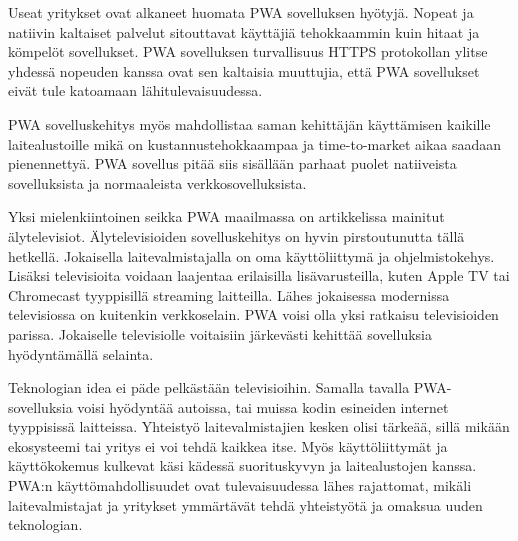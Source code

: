 \documentclass{tktltiki}
\begin{document}
Useat yritykset ovat alkaneet huomata PWA sovelluksen hyötyjä. Nopeat ja natiivin kaltaiset palvelut sitouttavat käyttäjiä tehokkaammin kuin hitaat ja kömpelöt sovellukset. PWA sovelluksen turvallisuus HTTPS protokollan ylitse yhdessä nopeuden kanssa ovat sen kaltaisia muuttujia, että PWA sovellukset eivät tule katoamaan lähitulevaisuudessa. \cite{8441701} 

PWA sovelluskehitys myös mahdollistaa saman kehittäjän käyttämisen kaikille laitealustoille mikä on kustannustehokkaampaa ja time-to-market aikaa saadaan pienennettyä. PWA sovellus pitää siis sisällään parhaat puolet natiiveista sovelluksista ja normaaleista verkkosovelluksista. 

Yksi mielenkiintoinen seikka PWA maailmassa on artikkelissa \cite{8287006} mainitut älytelevisiot. Älytelevisioiden sovelluskehitys on hyvin pirstoutunutta tällä hetkellä. Jokaisella laitevalmistajalla on oma käyttöliittymä ja ohjelmistokehys. Lisäksi televisioita voidaan laajentaa erilaisilla lisävarusteilla, kuten Apple TV tai Chromecast tyyppisillä streaming laitteilla. Lähes jokaisessa modernissa televisiossa on kuitenkin verkkoselain. PWA voisi olla yksi ratkaisu televisioiden parissa. Jokaiselle televisiolle voitaisiin järkevästi kehittää sovelluksia hyödyntämällä selainta. 

Teknologian idea ei päde pelkästään televisioihin. Samalla tavalla PWA-sovelluksia voisi hyödyntää autoissa, tai muissa kodin esineiden internet tyyppisissä laitteissa. Yhteistyö laitevalmistajien kesken olisi tärkeää, sillä mikään ekosysteemi tai yritys ei voi tehdä kaikkea itse. Myös käyttöliittymät ja käyttökokemus kulkevat käsi kädessä suorituskyvyn ja laitealustojen kanssa. PWA:n käyttömahdollisuudet ovat tulevaisuudessa lähes rajattomat, mikäli laitevalmistajat ja yritykset ymmärtävät tehdä yhteistyötä ja omaksua uuden teknologian. 

%
%


%

\clearpage


\lastpage

\appendices
\end{document}
